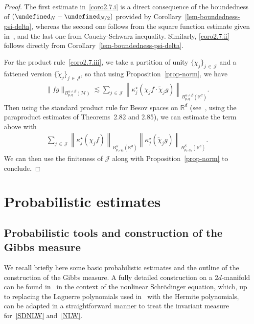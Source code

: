 \documentclass[10pt]{amsart}
\theoremstyle{definition}\newtheorem{defi}[theo]{Definition}\newtheorem{rema}[theo]{Remark}\newtheorem{exam}[theo]{Example}\newtheorem{exem}[theo]{Example}\newtheorem{nota}[theo]{Notation}
\newcommand{\R}{\mathbb{R}}
\let\P= \undefined
\newcommand{\P}{\mathbf{P}}
\newcommand{\J}{\mathcal{J}}
\newcommand{\M}{\mathcal{M}}
\newcommand{\kk}{\kappa}
\newcommand{\les}{\lesssim}
\begin{document}
\begin{proof}
The first estimate in~\eqref{coro2.7.i} is a direct consequence of the boundedness of $(\P_N-\P_{N/2})$ provided by Corollary~\ref{lem-boundedness-psi-delta}, whereas the second one follows from the square function estimate given in~\cite[Corollary~2.3]{BGT}, and the last one from Cauchy-Schwarz inequality. Similarly, \eqref{coro2.7.ii} follows directly from Corollary~\ref{lem-boundedness-psi-delta}.

For the product rule~\eqref{coro2.7.iii}, we take a partition of unity $\{\chi_j\}_{j\,\in\,\J}$ and a fattened version $\{\widetilde{\chi}_j\}_{j\,\in\,\J}$, so that using Proposition~\ref{prop-norm}, we have
\begin{align*}
\|fg\|_{B^{\alpha\wedge\beta}_{p,q}(\M)}\les \sum_{j\,\in\,\J}\left\|\kk_j^{\star}\left(\chi_jf\cdot\widetilde{\chi}_jg\right)\right\|_{B^{\alpha\wedge\beta}_{p,q}(\R^d)}.
\end{align*}
Then using the standard product rule for Besov spaces on $\R^d$ (see~\cite{BCD}, using the paraproduct estimates of Theorems~2.82 and 2.85), we can estimate the term above with
\begin{align*}
\sum_{j\,\in\,\J}\left\|\kk_j^{\star}(\chi_jf)\right\|_{B_{p_1,q_2}^{\alpha}(\R^d)}\left\|\kk_j^{\star}(\widetilde{\chi}_jg)\right\|_{B^{\beta}_{p_2,q_2}(\R^d)}.
\end{align*}
We can then use the finiteness of $\J$ along with Proposition~\ref{prop-norm} to conclude.
\end{proof}


\section{Probabilistic estimates}\label{sec-proba}
\subsection{Probabilistic tools and construction of the Gibbs measure}
We recall briefly here some basic probabilistic estimates and the outline of the construction of the Gibbs measure. A fully detailed construction on a $2d$-manifold can be found in~\cite{OT1} in the context of the nonlinear Schr\"odinger equation, which, up to replacing the Laguerre polynomials used in~\cite{OT1} with the Hermite polynomials, can be adapted in a straightforward manner to treat the invariant measure for~\eqref{SDNLW} and~\eqref{NLW}.
\end{document}
